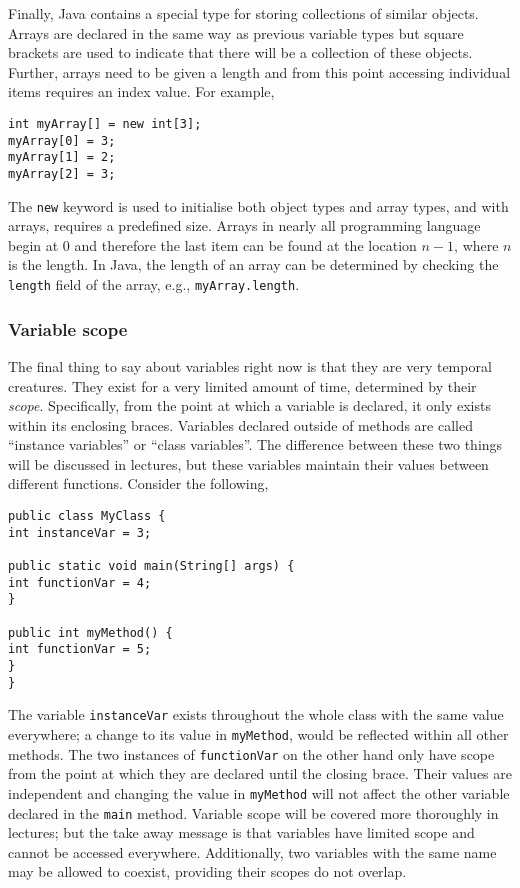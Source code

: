Finally, Java contains a special type for storing collections of similar objects. Arrays are declared in the same way as previous variable types but square brackets are used to indicate that there will be a collection of these objects. Further, arrays need to be given a length and from this point accessing individual items requires an index value. For example,

\begin{verbatim}
int myArray[] = new int[3];
myArray[0] = 3;
myArray[1] = 2;
myArray[2] = 3;
\end{verbatim}

\noindent
The {\tt new} keyword is used to initialise both object types and array types, and with arrays, requires a predefined size. Arrays in nearly all programming language begin at 0 and therefore the last item can be found at the location $n-1$, where $n$ is the length. In Java, the length of an array can be determined by checking the {\tt length} field of the array, e.g., {\tt myArray.length}.

\subsubsection*{Variable scope}

The final thing to say about variables right now is that they are very temporal creatures. They exist for a very limited amount of time, determined by their \emph{scope}. Specifically, from the point at which a variable is declared, it only exists within its enclosing braces. Variables declared outside of methods are called ``instance variables'' or ``class variables''. The difference between these two things will be discussed in lectures, but these variables maintain their values between different functions. Consider the following,

\begin{verbatim}
public class MyClass {
int instanceVar = 3;

public static void main(String[] args) {
int functionVar = 4;
}

public int myMethod() {
int functionVar = 5;
}
}
\end{verbatim}

\noindent
The variable {\tt instanceVar} exists throughout the whole class with the same value everywhere; a change to its value in {\tt myMethod}, would be reflected within all other methods. The two instances of {\tt functionVar} on the other hand only have scope from the point at which they are declared until the closing brace. Their values are independent and changing the value in {\tt myMethod} will not affect the other variable declared in the {\tt main} method. Variable scope will be covered more thoroughly in lectures; but the take away message is that variables have limited scope and cannot be accessed everywhere. Additionally, two variables with the same name may be allowed to coexist, providing their scopes do not overlap.

